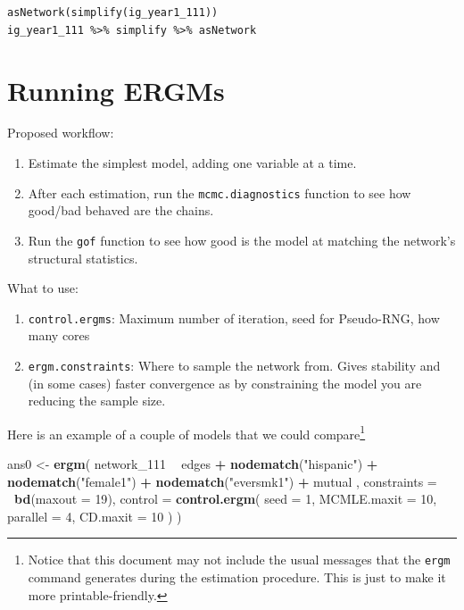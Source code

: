 \documentclass[]{book}
\newenvironment{Shaded}{\begin{snugshade}}{\end{snugshade}}
\newcommand{\KeywordTok}[1]{\textcolor[rgb]{0.13,0.29,0.53}{\textbf{#1}}}
\newcommand{\DataTypeTok}[1]{\textcolor[rgb]{0.13,0.29,0.53}{#1}}
\newcommand{\DecValTok}[1]{\textcolor[rgb]{0.00,0.00,0.81}{#1}}
\newcommand{\StringTok}[1]{\textcolor[rgb]{0.31,0.60,0.02}{#1}}
\newcommand{\OperatorTok}[1]{\textcolor[rgb]{0.81,0.36,0.00}{\textbf{#1}}}
\newcommand{\NormalTok}[1]{#1}
\let\rmarkdownfootnote\footnote%
\def\footnote{\protect\rmarkdownfootnote}
\theoremstyle{definition}
\theoremstyle{definition}
\theoremstyle{definition}
\theoremstyle{remark}
\begin{document}
\texttt{asNetwork(simplify(ig\_year1\_111))}
\texttt{ig\_year1\_111\ \%\textgreater{}\%\ simplify\ \%\textgreater{}\%\ asNetwork}

\section{Running ERGMs}\label{running-ergms}

Proposed workflow:

\begin{enumerate}
\def\labelenumi{\arabic{enumi}.}
\item
  Estimate the simplest model, adding one variable at a time.
\item
  After each estimation, run the \texttt{mcmc.diagnostics} function to
  see how good/bad behaved are the chains.
\item
  Run the \texttt{gof} function to see how good is the model at matching
  the network's structural statistics.
\end{enumerate}

What to use:

\begin{enumerate}
\def\labelenumi{\arabic{enumi}.}
\item
  \texttt{control.ergms}: Maximum number of iteration, seed for
  Pseudo-RNG, how many cores
\item
  \texttt{ergm.constraints}: Where to sample the network from. Gives
  stability and (in some cases) faster convergence as by constraining
  the model you are reducing the sample size.
\end{enumerate}

Here is an example of a couple of models that we could compare\footnote{Notice
  that this document may not include the usual messages that the
  \texttt{ergm} command generates during the estimation procedure. This
  is just to make it more printable-friendly.}

\begin{Shaded}
\begin{Highlighting}[]
\NormalTok{ans0 <-}\StringTok{ }\KeywordTok{ergm}\NormalTok{(}
\NormalTok{  network_}\DecValTok{111} \OperatorTok{~}
\StringTok{    }\NormalTok{edges }\OperatorTok{+}
\StringTok{    }\KeywordTok{nodematch}\NormalTok{(}\StringTok{"hispanic"}\NormalTok{) }\OperatorTok{+}
\StringTok{    }\KeywordTok{nodematch}\NormalTok{(}\StringTok{"female1"}\NormalTok{) }\OperatorTok{+}
\StringTok{    }\KeywordTok{nodematch}\NormalTok{(}\StringTok{"eversmk1"}\NormalTok{) }\OperatorTok{+}
\StringTok{    }\NormalTok{mutual}
\NormalTok{    ,}
  \DataTypeTok{constraints =} \OperatorTok{~}\KeywordTok{bd}\NormalTok{(}\DataTypeTok{maxout =} \DecValTok{19}\NormalTok{),}
  \DataTypeTok{control =} \KeywordTok{control.ergm}\NormalTok{(}
    \DataTypeTok{seed        =} \DecValTok{1}\NormalTok{,}
    \DataTypeTok{MCMLE.maxit =} \DecValTok{10}\NormalTok{,}
    \DataTypeTok{parallel    =} \DecValTok{4}\NormalTok{,}
    \DataTypeTok{CD.maxit    =} \DecValTok{10}
\NormalTok{    )}
\NormalTok{  )}
\end{Highlighting}
\end{Shaded}
\end{document}
